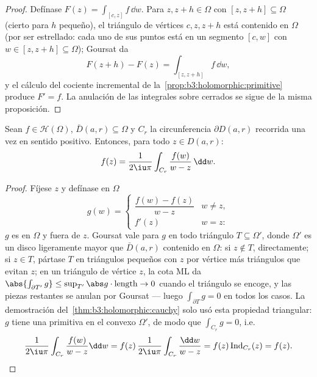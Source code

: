 \begin{proof}
Defínase $F(z) = \int_{[c,z]}f\,\dd w$. Para $z, z + h \in
\Omega$ con $[z, z+h] \subseteq \Omega$ (cierto para $h$ pequeño), el
triángulo de vértices $c, z, z+h$ está contenido en $\Omega$ (por ser
estrellado: cada uno de sus puntos está en un segmento $[c,
w]$ con $w \in [z, z+h] \subseteq \Omega$); Goursat da
\[
F(z + h) - F(z) = \int_{[z, z+h]}f\,\dd w,
\]
y el cálculo del cociente incremental de
la~\cref{prop:b3:holomorphic:primitive} produce $F' = f$. La anulación
de las integrales sobre 
cerrados se sigue de la misma proposición.
\end{proof}

\begin{theorem}
\label{thm:b3:holomorphic:formula}
Sean $f \in \mathcal H(\Omega)$, $\bar D(a, r) \subseteq
\Omega$ y $C_r$ la circunferencia $\partial D(a,r)$ recorrida una vez en
sentido positivo. Entonces, para todo $z \in D(a, r)$:
\[
f(z) = \frac1{2\iu\pi}\int_{C_r}\frac{f(w)}{w - z}\,\dd w .
\]
\end{theorem}

\begin{proof}
Fíjese $z$ y defínase en $\Omega$
\[
g(w) = \begin{cases}
\dfrac{f(w) - f(z)}{w - z} & w \neq z,\\[4pt]
f'(z) & w = z :
\end{cases}
\]
$g$ es  en $\Omega$ y
 fuera de $z$. Goursat vale
para $g$ en todo triángulo $T \subseteq \Omega'$, donde $\Omega'$ es un
disco ligeramente mayor que $\bar D(a,r)$ contenido en $\Omega$: si
$z \notin T$, directamente; si $z \in T$, pártase $T$ en triángulos
pequeños con $z$ por vértice más triángulos que evitan $z$; en un
triángulo de vértice $z$, la cota ML da
$\abs{\int_{\partial T'}g} \leq \sup_{T'}\abs
g\cdot\operatorname{length} \to 0$ cuando el triángulo se encoge, y las
piezas restantes se anulan por Goursat --- luego
$\int_{\partial T}g = 0$ en todos los casos. La demostración
del~\cref{thm:b3:holomorphic:cauchy} solo usó esta propiedad triangular:
$g$ tiene una primitiva en el convexo $\Omega'$, de modo que
$\int_{C_r}g = 0$, i.e.
\[
\frac1{2\iu\pi}\int_{C_r}\frac{f(w)}{w - z}\dd w
= f(z)\,\frac{1}{2\iu\pi}\int_{C_r}\frac{\dd w}{w - z}
= f(z)\operatorname{Ind}_{C_r}(z) = f(z) .
\]
\end{proof}

